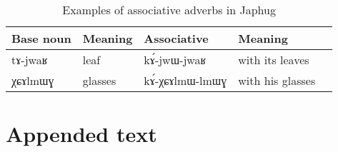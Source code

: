 \documentclass[oldfontcommands,oneside,a4paper,11pt]{article}
\newcommand{\ipa}[1]{{\phon #1}} %
\begin{document}
\begin{table}
 \caption{Examples of associative adverbs in Japhug} \label{tab:assoc.adv}  \centering
\begin{tabular}{lllll}
\toprule
Base noun & Meaning & Associative & Meaning \\
\midrule
\ipa{tɤ-jwaʁ} & leaf & \ipa{kɤ́-jwɯ-jwaʁ} & with its leaves\\
\ipa{χɕɤlmɯɣ} & glasses & \ipa{kɤ́-χɕɤlmɯ-lmɯɣ} & with his glasses\\
\bottomrule
\end{tabular}
\end{table}
         
         
     \section{Appended text}


\end{document}
